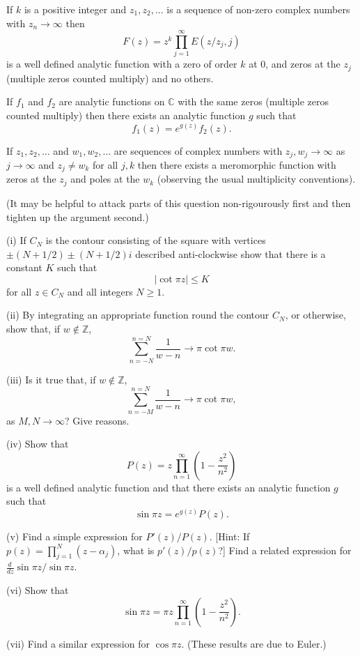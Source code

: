 \begin{theorem}[Weierstrass] If $k$ is a positive integer
and $z_{1},z_{2},\dots$ is a sequence of non-zero complex
numbers with $z_{n}\rightarrow\infty$ then
\[F(z)=z^{k}\prod_{j=1}^{\infty}E(z/z_{j},j)\]
is a well defined
analytic function with a zero of order $k$ at $0$,
and zeros at the $z_{j}$ (multiple zeros counted multiply)
and no others.
\end{theorem}
\begin{lemma} If $f_{1}$ and $f_{2}$ are analytic functions
on ${\mathbb C}$ with the same zeros (multiple zeros counted
multiply) then there exists an analytic function $g$
such that
\[f_{1}(z)=e^{g(z)}f_{2}(z).\]
\end{lemma}
\begin{lemma} If $z_{1},z_{2},\dots$ and $w_{1},w_{2},\dots$
are sequences of complex numbers with 
$z_{j},w_{j}\rightarrow\infty$ as $j\rightarrow\infty$
and $z_{j}\neq w_{k}$ for all $j,k$ then there exists
a meromorphic function with zeros at the $z_{j}$ 
and poles at the $w_{k}$ (observing the usual multiplicity
conventions).
\end{lemma}
\begin{exercise} (It may be helpful to attack parts
of this question non-rigourously first and then tighten up
the argument second.)

(i) If $C_{N}$ is the contour consisting of the square
with vertices $\pm (N+1/2)\pm (N+1/2)i$ described
anti-clockwise show that there is a constant $K$
such that
\[|\cot \pi z|\leq K\]
for all $z\in C_{N}$ and all integers $N\geq 1$.

(ii) By integrating an appropriate function round the
contour $C_{N}$, or otherwise,
show that, if $w\notin{\mathbb Z}$,
\[\sum_{n=-N}^{n=N}\frac{1}{w-n}\rightarrow  \pi\cot\pi w.\]

(iii) Is it true that, if $w\notin{\mathbb Z}$,
\[\sum_{n=-M}^{n=N}\frac{1}{w-n}\rightarrow  \pi\cot\pi w,\]
as $M,N\rightarrow\infty$? Give reasons.

(iv) Show that
\[P(z)=z\prod_{n=1}^{\infty}\left(1-\frac{z^{2}}{n^{2}}\right)\]
is a well defined analytic function and that there exists
an analytic function $g$ such that
\[\sin\pi z=e^{g(z)}P(z).\]

(v) Find a simple expression for
$P'(z)/P(z)$. [Hint: If $p(z)=\prod_{j=1}^{N}(z-\alpha_{j})$,
what is $p'(z)/p(z)$?] Find a related expression for
$\frac{d\ }{dz}\sin \pi z/\sin \pi z$.

(vi) Show that
\[\sin\pi z=\pi z\prod_{n=1}^{\infty}\left(1-\frac{z^{2}}{n^{2}}\right).\]

(vii) Find a similar expression for $\cos\pi z$. (These
results are due to Euler.)
\end{exercise}
